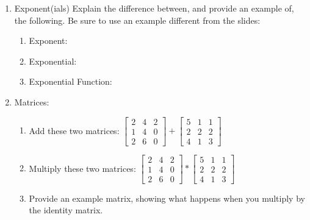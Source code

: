 \documentclass[12pt,thmsa]{article}
\begin{document}
\begin{enumerate}
    \item Exponent(ials)
        Explain the difference between, and provide an example of, the following. Be sure to use an example different from the slides: 
            \begin{enumerate}
                \item Exponent:
                \item Exponential:
                \item Exponential Function: 
            \end{enumerate}

    \item Matrices:
            \begin{enumerate}
                \item Add these two matrices: $
                    \begin{bmatrix}
                        2 & 4 & 2 \\
                        1 & 4 & 0 \\
                        2 & 6 & 0
                    \end{bmatrix}
                        +
                     \begin{bmatrix}
                     5 & 1 & 1 \\
                     2 & 2 & 2\\
                     4 & 1 & 3
                     \end{bmatrix}$


        \item Multiply these two matrices: $
                    \begin{bmatrix}
                        2 & 4 & 2 \\
                        1 & 4 & 0 \\
                        2 & 6 & 0
                    \end{bmatrix}
                    *
                    \begin{bmatrix}
                        5 & 1 & 1 \\
                        2 & 2 & 2 \\
                        4 & 1 & 3
                    \end{bmatrix}
                    $
            \item Provide an example matrix, showing what happens when you multiply by the identity matrix. 
        \end{enumerate}



\end{enumerate}
\end{document}
